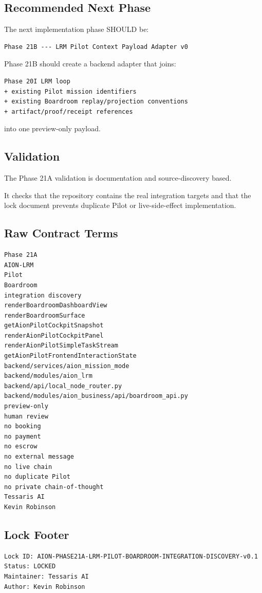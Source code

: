 \subsection{Recommended Next Phase}

The next implementation phase SHOULD be:

\begin{verbatim}
Phase 21B --- LRM Pilot Context Payload Adapter v0
\end{verbatim}

Phase 21B should create a backend adapter that joins:

\begin{verbatim}
Phase 20I LRM loop
+ existing Pilot mission identifiers
+ existing Boardroom replay/projection conventions
+ artifact/proof/receipt references
\end{verbatim}

into one preview-only payload.

\subsection{Validation}

The Phase 21A validation is documentation and source-discovery based.

It checks that the repository contains the real integration targets and that the lock document prevents duplicate Pilot or live-side-effect implementation.

\subsection{Raw Contract Terms}

\begin{verbatim}
Phase 21A
AION-LRM
Pilot
Boardroom
integration discovery
renderBoardroomDashboardView
renderBoardroomSurface
getAionPilotCockpitSnapshot
renderAionPilotCockpitPanel
renderAionPilotSimpleTaskStream
getAionPilotFrontendInteractionState
backend/services/aion_mission_mode
backend/modules/aion_lrm
backend/api/local_node_router.py
backend/modules/aion_business/api/boardroom_api.py
preview-only
human review
no booking
no payment
no escrow
no external message
no live chain
no duplicate Pilot
no private chain-of-thought
Tessaris AI
Kevin Robinson
\end{verbatim}

\subsection{Lock Footer}

\begin{verbatim}
Lock ID: AION-PHASE21A-LRM-PILOT-BOARDROOM-INTEGRATION-DISCOVERY-v0.1
Status: LOCKED
Maintainer: Tessaris AI
Author: Kevin Robinson
\end{verbatim}

